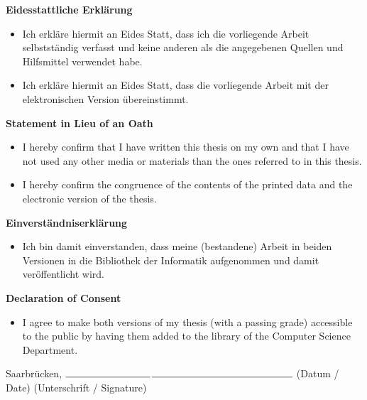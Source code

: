 \documentclass[12pt, a4paper, twoside]{Thesis} %
\begin{document}
% 



\pagestyle{empty} 
\begin{center}
\Large\textbf{Eidesstattliche Erklärung} \\
\end{center}
\noindent
\begin{itemize}
\item
Ich erkläre hiermit an Eides Statt, dass ich die vorliegende Arbeit selbstständig verfasst und keine
anderen als die angegebenen Quellen und Hilfsmittel verwendet habe.
\item
Ich erkläre hiermit an Eides Statt, dass die vorliegende Arbeit mit der elektronischen Version
übereinstimmt. 
\end{itemize}
\begin{center}
\Large\textbf{Statement in Lieu of an Oath} \\
\end{center}
\noindent
\begin{itemize}
\item
I hereby confirm that I have written this thesis on my own and that I have not used any other media or
materials than the ones referred to in this thesis.
\item
I hereby confirm the congruence of the contents of the printed data and the electronic version of
the thesis. 
\end{itemize}
\begin{center}
\Large\textbf{Einverständniserklärung} \\
\end{center}
\noindent
\begin{itemize}
\item
Ich bin damit einverstanden, dass meine (bestandene) Arbeit in beiden Versionen in die Bibliothek der
Informatik aufgenommen und damit veröffentlicht wird.
\end{itemize}
\begin{center}
\Large\textbf{Declaration of Consent} \\
\end{center}
\noindent
\begin{itemize}
\item
I agree to make both versions of my thesis (with a passing grade) accessible to the public by having
them added to the library of the Computer Science Department.
\end{itemize}
\vspace{2cm}
Saarbrücken, $\rule{3cm}{0.15mm}$\hspace{4cm}$\rule{5cm}{0.15mm}$ \newline
\hspace*{2.5cm}(Datum / Date) \hspace{4cm}(Unterschrift / Signature)
\end{document}
